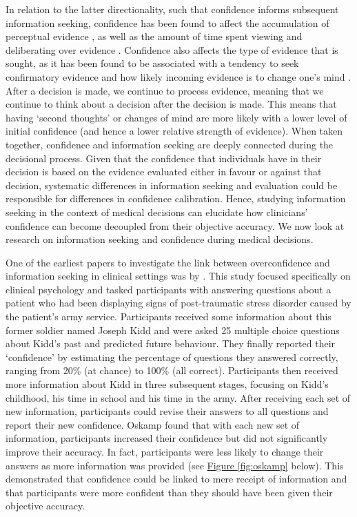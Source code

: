 \documentclass[a4paper, nobind]{templates/ociamthesis}
\begin{document}
\hfill\break
In relation to the latter directionality, such that confidence informs subsequent information seeking, confidence has been found to affect the accumulation of perceptual evidence \textcite{balsdon_confidence_2020}, as well as the amount of time spent viewing \autocite{rausch_cognitive_2020} and deliberating over evidence \autocite{kiani_choice_2014}. Confidence also affects the type of evidence that is sought, as it has been found to be associated with a tendency to seek confirmatory evidence \autocite{rollwage_confidence_2020} and how likely incoming evidence is to change one's mind \autocite{pescetelli_confidence_2021}. After a decision is made, we continue to process evidence, meaning that we continue to think about a decision after the decision is made. This means that having `second thoughts' or changes of mind are more likely with a lower level of initial confidence (and hence a lower relative strength of evidence). When taken together, confidence and information seeking are deeply connected during the decisional process. Given that the confidence that individuals have in their decision is based on the evidence evaluated either in favour or against that decision, systematic differences in information seeking and evaluation could be responsible for differences in confidence calibration. Hence, studying information seeking in the context of medical decisions can elucidate how clinicians' confidence can become decoupled from their objective accuracy. We now look at research on information seeking and confidence during medical decisions.

\hfill\break
One of the earliest papers to investigate the link between overconfidence and information seeking in clinical settings was by \textcite{oskamp_overconfidence_1965}. This study focused specifically on clinical psychology and tasked participants with answering questions about a patient who had been displaying signs of post-traumatic stress disorder caused by the patient's army service. Participants received some information about this former soldier named Joseph Kidd and were asked 25 multiple choice questions about Kidd's past and predicted future behaviour. They finally reported their `confidence' by estimating the percentage of questions they answered correctly, ranging from 20\% (at chance) to 100\% (all correct). Participants then received more information about Kidd in three subsequent stages, focusing on Kidd's childhood, his time in school and his time in the army. After receiving each set of new information, participants could revise their answers to all questions and report their new confidence. Oskamp found that with each new set of information, participants increased their confidence but did not significantly improve their accuracy. In fact, participants were less likely to change their answers as more information was provided (see \hyperref[fig:oskamp]{Figure \ref{fig:oskamp}} below). This demonstrated that confidence could be linked to mere receipt of information and that participants were more confident than they should have been given their objective accuracy.
\end{document}
